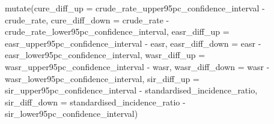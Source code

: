 \documentclass[
]{article}
\newenvironment{Shaded}{\begin{snugshade}}{\end{snugshade}}
\newcommand{\AttributeTok}[1]{\textcolor[rgb]{0.77,0.63,0.00}{#1}}
\newcommand{\FunctionTok}[1]{\textcolor[rgb]{0.00,0.00,0.00}{#1}}
\newcommand{\NormalTok}[1]{#1}
\newcommand{\SpecialCharTok}[1]{\textcolor[rgb]{0.00,0.00,0.00}{#1}}
\begin{document}
\begin{Shaded}
\begin{Highlighting}[]
  \FunctionTok{mutate}\NormalTok{(}\AttributeTok{cure\_diff\_up =}\NormalTok{ crude\_rate\_upper95pc\_confidence\_interval }\SpecialCharTok{{-}}\NormalTok{ crude\_rate,}
         \AttributeTok{cure\_diff\_down =}\NormalTok{ crude\_rate }\SpecialCharTok{{-}}\NormalTok{ crude\_rate\_lower95pc\_confidence\_interval,}
         \AttributeTok{easr\_diff\_up =}\NormalTok{ easr\_upper95pc\_confidence\_interval }\SpecialCharTok{{-}}\NormalTok{ easr,}
         \AttributeTok{easr\_diff\_down =}\NormalTok{ easr }\SpecialCharTok{{-}}\NormalTok{ easr\_lower95pc\_confidence\_interval,}
         \AttributeTok{wasr\_diff\_up =}\NormalTok{ wasr\_upper95pc\_confidence\_interval }\SpecialCharTok{{-}}\NormalTok{ wasr,}
         \AttributeTok{wasr\_diff\_down =}\NormalTok{ wasr }\SpecialCharTok{{-}}\NormalTok{ wasr\_lower95pc\_confidence\_interval,}
         \AttributeTok{sir\_diff\_up =}\NormalTok{ sir\_upper95pc\_confidence\_interval }\SpecialCharTok{{-}}\NormalTok{ standardised\_incidence\_ratio,}
         \AttributeTok{sir\_diff\_down =}\NormalTok{ standardised\_incidence\_ratio }\SpecialCharTok{{-}}\NormalTok{ sir\_lower95pc\_confidence\_interval)}


\end{Highlighting}
\end{Shaded}
\end{document}
